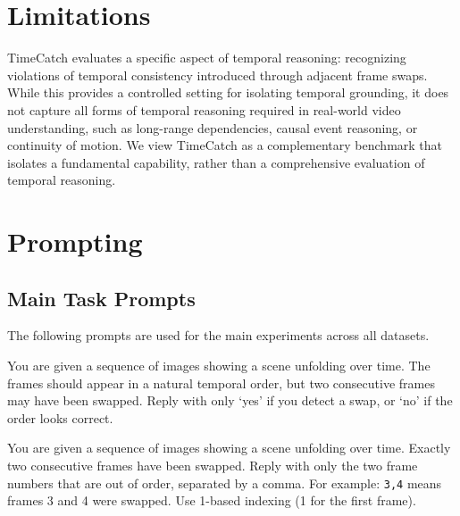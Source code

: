 \documentclass[11pt]{article}
\begin{document}
\section*{Limitations}

TimeCatch evaluates a specific aspect of temporal reasoning: recognizing violations of temporal consistency introduced through adjacent frame swaps. While this provides a controlled setting for isolating temporal grounding, it does not capture all forms of temporal reasoning required in real-world video understanding, such as long-range dependencies, causal event reasoning, or continuity of motion. We view TimeCatch as a complementary benchmark that isolates a fundamental capability, rather than a comprehensive evaluation of temporal reasoning.




%


\newpage
\appendix

\section{Prompting}
\label{appendix:prompting}

\subsection{Main Task Prompts}
The following prompts are used for the main experiments across all datasets.


\begin{tcolorbox}[colback=gray!5,colframe=gray!40,title=Temporal Detect]
You are given a sequence of images showing a scene unfolding over
time. The frames should appear in a natural temporal order, but two
consecutive frames may have been swapped. Reply with only `yes' if you
detect a swap, or `no' if the order looks correct.
\end{tcolorbox}


\begin{tcolorbox}[colback=gray!5,colframe=gray!40,title=Temporal Localize]
You are given a sequence of images showing a scene unfolding over time. Exactly two consecutive frames have been swapped. Reply with only the two frame numbers that are out of order, separated by a comma. For example: \texttt{3,4} means frames 3 and 4 were swapped. Use 1-based indexing (1 for the first frame).
\end{tcolorbox}
\end{document}
